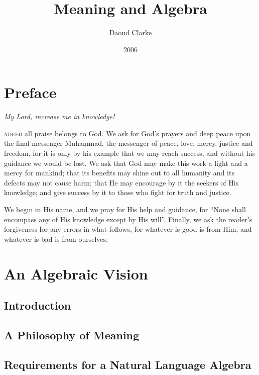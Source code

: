 \documentclass[a4paper,oneside,12pt]{report}
\title{Meaning and Algebra}
\author{Daoud Clarke}
\date{2006}
\begin{document}
\maketitle


 \chapter*{\cmchapter Preface}

\textsf{\textsl{My Lord, increase me in knowledge!}}
\newline

\textsc{ndeed} all praise belongs to God. We ask for God's prayers and deep peace upon the final 
messenger Muhammad, the messenger of peace, love, mercy, justice and freedom, for it is only by his example that we may reach success, and without his guidance we would be lost. We ask that God may make this work a light and a mercy for mankind; that its benefits may shine out to all humanity and its defects may not cause harm; that He may encourage by it the seekers of His knowledge; and give success by it to those who fight for truth and justice.
 
 We begin in His name, and we pray for His help and guidance, for ``None shall encompass any of His knowledge except by His will''.  Finally, we ask the reader's forgiveness for any errors in what follows, for whatever is good is from Him, and whatever is bad is from ourselves. 

%

\tableofcontents

%

\chapter{An Algebraic Vision}

\section{Introduction}

\section{A Philosophy of Meaning}

\section{Requirements for a Natural Language Algebra}
\end{document}
